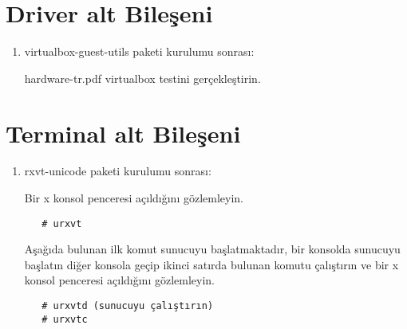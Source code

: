 \documentclass[a4paper,10pt]{article}
\begin{document}
\section{Driver alt Bileşeni}
\begin{enumerate}
 \item virtualbox-guest-utils paketi kurulumu sonrası:

hardware-tr.pdf virtualbox testini gerçekleştirin.
\end{enumerate}

\section{Terminal alt Bileşeni}
\begin{enumerate}
 \item rxvt-unicode paketi kurulumu sonrası:

Bir x konsol penceresi açıldığını gözlemleyin.
  \begin{verbatim}
   # urxvt
  \end{verbatim}

Aşağıda bulunan ilk komut sunucuyu başlatmaktadır, bir konsolda sunucuyu başlatın diğer konsola geçip ikinci satırda bulunan komutu çalıştırın ve bir x konsol penceresi açıldığını gözlemleyin.
  \begin{verbatim}
   # urxvtd (sunucuyu çalıştırın)
   # urxvtc
  \end{verbatim}

   

\end{enumerate}
\end{document}
